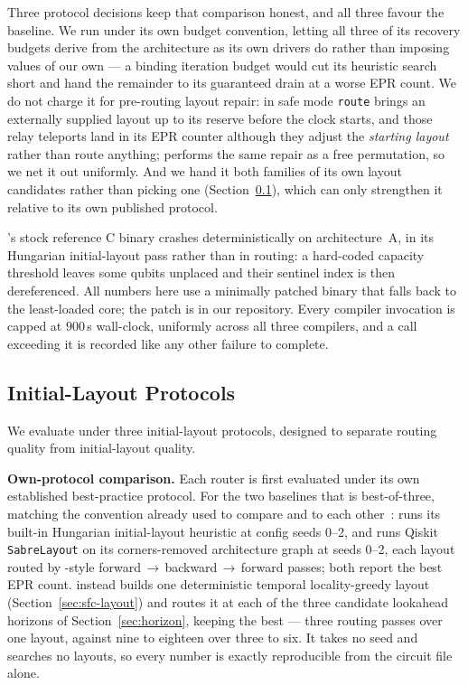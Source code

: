 Three protocol decisions keep that comparison honest, and all three
favour the baseline. We run \dSABRE{} under its own budget convention,
letting all three of its recovery budgets derive from the architecture
as its own drivers do rather than imposing values of our own --- a
binding iteration budget would cut its heuristic search short and hand
the remainder to its guaranteed drain at a worse EPR count. We do not charge it for pre-routing layout repair: in safe mode
\texttt{route} brings an externally supplied layout up to its reserve
before the clock starts, and those relay teleports land in its EPR
counter although they adjust the \emph{starting layout} rather than
route anything; \PORTER{} performs the same repair as a free
permutation, so we net it out uniformly. And we
hand it both families of its own layout candidates rather than picking
one (Section~\ref{sec:protocols}), which can only strengthen it
relative to its own published protocol.

\TeleSABRE{}'s stock reference C binary crashes deterministically on
architecture~A, in its Hungarian initial-layout pass rather than in
routing: a hard-coded capacity threshold leaves some qubits unplaced and
their sentinel index is then dereferenced. All \TeleSABRE{} numbers here
use a minimally patched binary that falls back to the least-loaded core;
the patch is in our repository. Every compiler invocation is capped at $900$\,s
wall-clock, uniformly across all three compilers, and a call exceeding
it is recorded like any other failure to complete.

\subsection{Initial-Layout Protocols}
\label{sec:protocols}

We evaluate under three initial-layout protocols, designed to separate
routing quality from initial-layout quality.

\textbf{Own-protocol comparison.} Each router is first evaluated under
its own established best-practice protocol. For the two baselines that
is best-of-three, matching the convention already used to compare
\TeleSABRE{} and \dSABRE{} to each other~\cite{lidsabre}:
\TeleSABRE{} runs its built-in Hungarian initial-layout heuristic at
config seeds 0--2, and \dSABRE{} runs Qiskit \texttt{SabreLayout} on
its corners-removed architecture graph at seeds 0--2, each layout
routed by \SABRE{}-style forward\,$\to$\,backward\,$\to$\,forward
passes; both report the best EPR count. \PORTER{} instead builds one
deterministic temporal locality-greedy layout
(Section~\ref{sec:sfc-layout}) and routes it at each of the three
candidate lookahead horizons of Section~\ref{sec:horizon}, keeping the
best --- three routing passes over one layout, against nine to eighteen
over three to six. It takes no seed and searches no layouts, so every
number is exactly reproducible from the circuit file alone.

